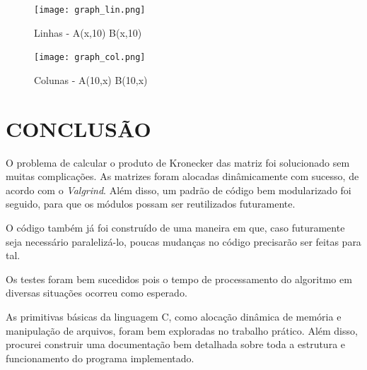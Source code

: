 \documentclass[12pt]{article}
\begin{document}
\begin{figure}[p!]
	\centering
	\texttt{[image: graph\_lin.png]}
	\caption{Linhas - A(x,10) B(x,10)}
	\label{linhas}
\end{figure}

\begin{figure}[p!]
	\centering
	\texttt{[image: graph\_col.png]}
	\caption{Colunas - A(10,x) B(10,x)}
	\label{colunas}
\end{figure}

\section{CONCLUSÃO}
\label{conclusao}

	O problema de calcular o produto de Kronecker das matriz foi solucionado sem muitas complicações. As matrizes foram alocadas dinâmicamente com sucesso, de acordo com o \textit{Valgrind}. Além disso, um padrão de código bem modularizado foi seguido, para que os módulos possam ser reutilizados futuramente.

	O código também já foi construído de uma maneira em que, caso futuramente seja necessário paralelizá-lo, poucas mudanças no código precisarão ser feitas para tal.

	Os testes foram bem sucedidos pois o tempo de processamento do algoritmo em diversas situações ocorreu como esperado.

	As primitivas básicas da linguagem C, como alocação dinâmica de memória e manipulação de arquivos, foram bem exploradas no trabalho prático. Além disso, procurei construir uma documentação bem detalhada sobre toda a estrutura e funcionamento do programa implementado.



\end{document}
